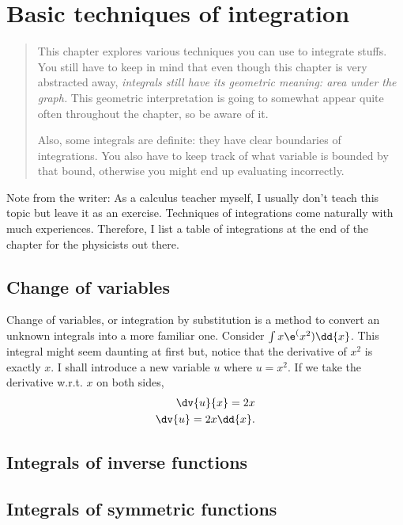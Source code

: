 \chapter{Basic techniques of integration}
\label{sec:techniquesofintegration}

\begin{abstract}
    This chapter explores various techniques you can use to integrate stuffs. You still have to keep in mind that even though this chapter is very abstracted away, \emph{integrals still have its geometric meaning: area under the graph.} This geometric interpretation is going to somewhat appear quite often throughout the chapter, so be aware of it.

    Also, some integrals are definite: they have clear boundaries of integrations. You also have to keep track of what variable is bounded by that bound, otherwise you might end up evaluating incorrectly.
\end{abstract}

Note from the writer: As a calculus teacher myself, I usually don't teach this topic but leave it as an exercise. Techniques of integrations come naturally with much experiences. Therefore, I list a table of integrations at the end of the chapter for the physicists out there.

\section{Change of variables}
\label{sec:changeofvariables}

Change of variables, or integration by substitution is a method to convert an unknown integrals into a more familiar one. Consider $\int x\e^(x^2)\dd{x}$. This integral might seem daunting at first but, notice that the derivative of $x^2$ is exactly $x$. I shall introduce a new variable $u$ where $u = x^2$. If we take the derivative w.r.t. $x$ on both sides,
\begin{align*}
    \dv{u}{x} = 2x \\
    \dv{u} = 2x\dd{x}.
\end{align*}

\section{Integrals of inverse functions}

\section{Integrals of symmetric functions}

